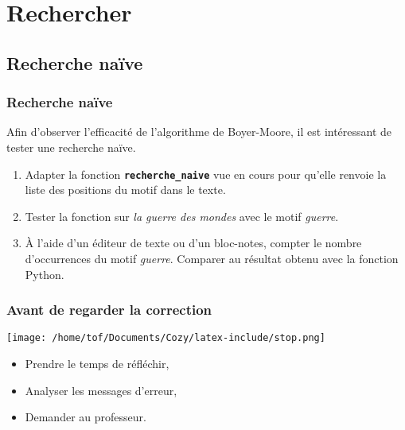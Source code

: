 \documentclass[svgnames,11pt]{beamer}
\begin{document}
\section{Rechercher}
\subsection{Recherche naïve}
\begin{frame}
    \frametitle{Recherche naïve}

    Afin d'observer l'efficacité de l'algorithme de Boyer-Moore, il est intéressant de tester une recherche naïve.
    \begin{activite}
    \begin{enumerate}
        \item Adapter la fonction \textbf{\texttt{recherche\_naive}} vue en cours pour qu'elle renvoie la liste des positions du motif dans le texte.
        \item Tester la fonction sur \emph{la guerre des mondes} avec le motif \emph{guerre}.
        \item À l'aide d'un éditeur de texte ou d'un bloc-notes, compter le nombre d'occurrences du motif \emph{guerre}. Comparer au résultat obtenu avec la fonction Python.
    \end{enumerate}
    \end{activite}

\end{frame}
\begin{frame}
    \frametitle{Avant de regarder la correction}
\begin{center}
    \centering
    \texttt{[image: /home/tof/Documents/Cozy/latex-include/stop.png]}
    \end{center}
{\Large
    \begin{itemize}
        \item Prendre le temps de réfléchir,
        \item Analyser les messages d'erreur,
        \item Demander au professeur.
    \end{itemize}
}
\end{frame}
\end{document}
